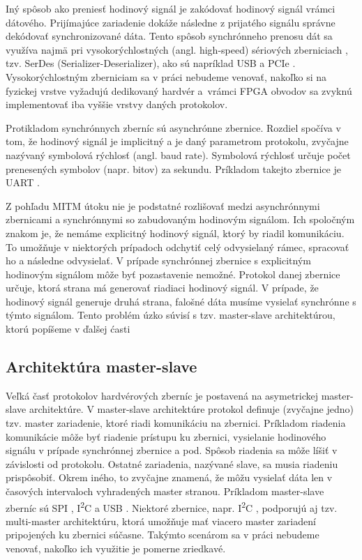 Iný spôsob ako preniesť hodinový signál je zakódovať hodinový signál vrámci dátového. Prijímajúce zariadenie dokáže následne z prijatého signálu správne dekódovať synchronizované dáta. Tento spôsob synchrónneho prenosu dát sa využíva najmä pri vysokorýchlostných (angl. high-speed) sériových zberniciach \cite{serdes}, tzv. SerDes (Serializer-Deserializer), ako sú napríklad USB \cite{usbSpec} a PCIe \cite{pcieSpec}. Vysokorýchlostným zberniciam sa v práci nebudeme venovať, nakoľko si na fyzickej vrstve vyžadujú dedikovaný hardvér a~vrámci FPGA obvodov sa zvyknú implementovať iba vyššie vrstvy daných protokolov.

Protikladom synchrónnych zberníc sú asynchrónne zbernice. Rozdiel spočíva v tom, že hodinový signál je implicitný a je daný parametrom protokolu, zvyčajne nazývaný symbolová rýchlosť (angl. baud rate). Symbolová rýchlosť určuje počet prenesených symbolov (napr. bitov) za sekundu. Príkladom takejto zbernice je UART \cite{uartBus}.

Z pohľadu MITM útoku nie je podstatné rozlišovať medzi asynchrónnymi zbernicami a synchrónnymi so zabudovaným hodinovým signálom. Ich spoločným znakom je, že nemáme explicitný hodinový signál, ktorý by riadil komunikáciu. To umožňuje v niektorých prípadoch odchytiť celý odvysielaný rámec, spracovať ho a následne odvysielať. V prípade synchrónnej zbernice s explicitným hodinovým signálom môže byť pozastavenie nemožné. Protokol danej zbernice určuje, ktorá strana má generovať riadiaci hodinový signál. V prípade, že hodinový signál generuje druhá strana, falošné dáta musíme vysielať synchrónne s týmto signálom. Tento problém úzko súvisí s tzv. master-slave architektúrou, ktorú popíšeme v ďalšej ćasti

\subsection{Architektúra master-slave} \label{sek:masterSlave}
Veľká časť protokolov hardvérových zberníc je postavená na asymetrickej master-slave architektúre. V master-slave architektúre protokol definuje (zvyčajne jedno) tzv. master zariadenie, ktoré riadi komunikáciu na zbernici. Príkladom riadenia komunikácie môže byť riadenie prístupu ku zbernici, vysielanie hodinového signálu v prípade synchrónnej zbernice a pod. Spôsob riadenia sa môže líšiť v závislosti od protokolu. Ostatné zariadenia, nazývané slave, sa musia riadeniu prispôsobiť. Okrem iného, to zvyčajne znamená, že môžu vysielať dáta len v časových intervaloch vyhradených master stranou. Príkladom master-slave zberníc sú SPI \cite{spiBus}, I\textsuperscript{2}C \cite{i2cSpec} a USB \cite{usbSpec}. Niektoré zbernice, napr. I\textsuperscript{2}C \cite{i2cSpec}, podporujú aj tzv. multi-master architektúru, ktorá umožňuje mať viacero master zariadení pripojených ku zbernici súčasne. Takýmto scenárom sa v práci nebudeme venovať, nakoľko ich využitie je pomerne zriedkavé.


